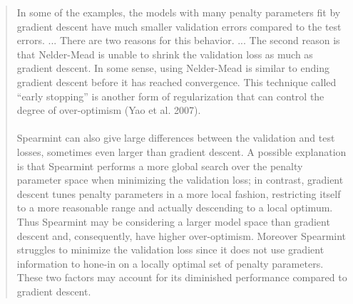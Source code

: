 \documentclass[]{article}
\begin{document}
\begin{enumerate}
		\begin{quote}
			In some of the examples, the models with many penalty parameters fit by gradient descent have much smaller validation errors compared to the test errors. ... There are two reasons for this behavior. ... The second reason is that Nelder-Mead is unable to shrink the validation loss as much as gradient descent. In some sense, using Nelder-Mead is similar to ending gradient descent before it has reached convergence. This technique called ``early stopping'' is another form of regularization that can control the degree of over-optimism (Yao et al. 2007).
			\\
			\\
			Spearmint can also give large differences between the validation and test losses, sometimes even larger than gradient descent.
			A possible explanation is that Spearmint performs a more global search over the penalty parameter space when minimizing the validation loss; in contrast, gradient descent tunes penalty parameters in a more local fashion, restricting itself to a more reasonable range and actually descending to a local optimum.
			Thus Spearmint may be considering a larger model space than gradient descent and, consequently, have higher over-optimism.
			Moreover Spearmint struggles to minimize the validation loss since it does not use gradient information to hone-in on a locally optimal set of penalty parameters.
			These two factors may account for its diminished performance compared to gradient descent.
		\end{quote}
		
		\end{enumerate}
\end{document}
